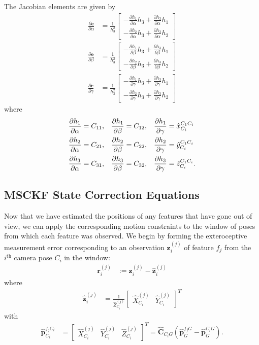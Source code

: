 \documentclass[letterpaper, 10 pt, conference]{ieeeconf}  %
\def\Vec#1{\mathbf{#1}}
\newcommand{\bbm}{\begin{bmatrix}}
\newcommand{\ebm}{\end{bmatrix}}
\begin{document}
The Jacobian elements are given by
\begin{align}
\frac{\partial \Vec e}{\partial \alpha} &= 
    \frac{1}{h_3^2} \bbm -\frac{\partial h_1}{\partial \alpha} h_3 + \frac{\partial h_3}{\partial \alpha} h_1 \\[0.5em]
                        -\frac{\partial h_2}{\partial \alpha} h_3 + \frac{\partial h_3}{\partial \alpha} h_2 \ebm
\\[0.5em]
\frac{\partial \Vec e}{\partial \beta} &= 
    \frac{1}{h_3^2} \bbm -\frac{\partial h_1}{\partial \beta} h_3 + \frac{\partial h_3}{\partial \beta} h_1 \\[0.5em] 
                        -\frac{\partial h_2}{\partial \beta} h_3 + \frac{\partial h_3}{\partial \beta} h_2 \ebm
\\[0.5em]
\frac{\partial \Vec e}{\partial \gamma} &= 
    \frac{1}{h_3^2} \bbm -\frac{\partial h_1}{\partial \gamma} h_3 + \frac{\partial h_3}{\partial \gamma} h_1 \\[0.5em] 
                        -\frac{\partial h_2}{\partial \gamma} h_3 + \frac{\partial h_3}{\partial \gamma} h_2 \ebm
\end{align}
where
\begin{align}
\frac{\partial h_1}{\partial \alpha} &= C_{11}, & \frac{\partial h_1}{\partial \beta} &= C_{12}, & \frac{\partial h_1}{\partial \gamma} &= \hat{x}_{C_i}^{C_1 C_i} \notag \\
\frac{\partial h_2}{\partial \alpha} &= C_{21}, & \frac{\partial h_2}{\partial \beta} &= C_{22}, & \frac{\partial h_2}{\partial \gamma} &= \hat{y}_{C_i}^{C_1 C_i} \\
\frac{\partial h_3}{\partial \alpha} &= C_{31}, & \frac{\partial h_3}{\partial \beta} &= C_{32}, & \frac{\partial h_3}{\partial \gamma} &= \hat{z}_{C_i}^{C_1 C_i} \notag .
\end{align}

\subsection{MSCKF State Correction Equations}
Now that we have estimated the positions of any features that have gone out of view, we can apply the corresponding motion constraints to the window of poses from which each feature was observed.
We begin by forming the exteroceptive measurement error corresponding to an observation $\Vec{z}_i^{(j)}$ of feature $f_j$ from the $i^\text{th}$ camera pose $C_i$ in the window:
\begin{align} \label{eq:residual_def}
    \Vec{r}_i^{(j)} &:= \Vec{z}_i^{(j)} - \hat{\Vec{z}}_i^{(j)}
\end{align}
where
\begin{align}
    \hat{\Vec{z}}_i^{(j)} &= \frac{1}{\hat{Z}^{(j)}_{C_i}} \bbm \hat{X}^{(j)}_{C_i} & \hat{Y}^{(j)}_{C_i} \ebm ^T
\end{align}
with 
\begin{align}
    \hat{\Vec{p}}_{C_i}^{f_j C_i} &= \bbm \hat{X}^{(j)}_{C_i} & \hat{Y}^{(j)}_{C_i} & \hat{Z}^{(j)}_{C_i} \ebm ^T = \hat{\Vec{C}}_{C_i G} \left( \hat{\Vec{p}}_G^{f_j G} - \hat{\Vec{p}}_G^{C_i G} \right).
\end{align}
\end{document}

